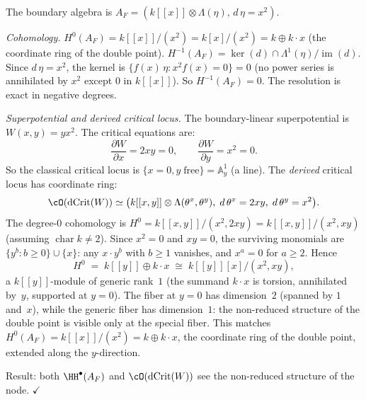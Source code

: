 \begin{computation}[Node: $F(x) = x^2$]
\label{comp:lg-node}
The boundary algebra is
$A_F = (k[[x]] \otimes \Lambda(\eta),\, d\,\eta = x^2)$.

\emph{Cohomology.}
$H^0(A_F) = k[[x]]/(x^2) = k[x]/(x^2) = k \oplus k\cdot x$
(the coordinate ring of the double point).
$H^{-1}(A_F) = \ker(d) \cap \Lambda^1(\eta) / \operatorname{im}(d)$.
Since $d\,\eta = x^2$, the kernel is $\{f(x)\,\eta : x^2 f(x) = 0\}
= 0$ (no power series is annihilated by $x^2$ except $0$ in $k[[x]]$).
So $H^{-1}(A_F) = 0$. The resolution is exact in negative degrees.

\emph{Superpotential and derived critical locus.}
The boundary-linear superpotential is $W(x,y) = yx^2$.
The critical equations are:
\[
\frac{\partial W}{\partial x} = 2xy = 0, \qquad
\frac{\partial W}{\partial y} = x^2 = 0.
\]
So the classical critical locus is $\{x = 0, y\;\text{free}\} = \mathbb{A}^1_y$
(a line). The \emph{derived} critical locus has coordinate ring:
\[
\cO(\operatorname{dCrit}(W))
\simeq
\bigl(k[[x, y]] \otimes \Lambda(\theta^x, \theta^y),\;
d\,\theta^x = 2xy,\; d\,\theta^y = x^2\bigr).
\]
The degree-$0$ cohomology is
$H^0 = k[[x,y]]/(x^2, 2xy) = k[[x,y]]/(x^2, xy)$
(assuming $\operatorname{char} k \neq 2$).
Since $x^2 = 0$ and $xy = 0$, the surviving monomials are
$\{y^b : b \geq 0\} \cup \{x\}$:
any $x \cdot y^b$ with $b \geq 1$ vanishes, and $x^a = 0$
for $a \geq 2$. Hence
\[
H^0 \;=\; k[[y]] \oplus k \cdot x
\;\cong\; k[[y]][x]/(x^2, xy),
\]
a $k[[y]]$-module of generic rank~$1$ (the summand $k \cdot x$
is torsion, annihilated by~$y$, supported at $y = 0$).
The fiber at $y = 0$ has dimension~$2$ (spanned by $1$
and~$x$), while the generic fiber has dimension~$1$:
the non-reduced structure of the double point is visible
only at the special fiber.
This matches $H^0(A_F) = k[[x]]/(x^2) = k \oplus k \cdot x$,
the coordinate ring of the double point, extended along the
$y$-direction.

Result: both $\HH^\bullet(A_F)$ and $\cO(\operatorname{dCrit}(W))$
see the non-reduced structure of the node.
\hfill$\checkmark$
\end{computation}

